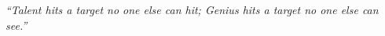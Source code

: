 \thispagestyle{empty}

\null{}
\textit{``Talent hits a target no one else can hit; Genius hits a target no one else can see.''}\\
\null
\newpage